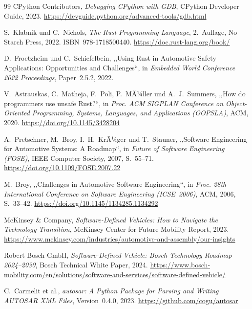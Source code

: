 ﻿\documentclass[12pt,a4paper,twoside]{article}
\newcommand{\doi}[1]{\url{https://doi.org/#1}}
\begin{document}
\begin{thebibliography}{99}
  {CPython Contributors},
  \textit{Debugging CPython with GDB},
  CPython Developer Guide, 2023.
  \url{https://devguide.python.org/advanced-tools/gdb.html}


  S.~Klabnik und C.~Nichols,
  \textit{The Rust Programming Language},
  2.~Auflage, No Starch Press, 2022.
  ISBN~978-1718500440.
  \url{https://doc.rust-lang.org/book/}

  D.~Froetzheim und C.~Schiefelbein,
  ,,Using Rust in Automotive Safety Applications: Opportunities and Challenges``,
  in \textit{Embedded World Conference 2022 Proceedings}, Paper~2.5.2, 2022.

  V.~Astrauskas, C.~Matheja, F.~Poli, P.~MÃ¼ller und A.~J.~Summers,
  ,,How do programmers use unsafe Rust?``,
  in \textit{Proc. ACM SIGPLAN Conference on Object-Oriented Programming,
  Systems, Languages, and Applications (OOPSLA)}, ACM, 2020.
  \doi{10.1145/3428204}


  A.~Pretschner, M.~Broy, I.~H.~KrÃ¼ger und T.~Stauner,
  ,,Software Engineering for Automotive Systems: A Roadmap``,
  in \textit{Future of Software Engineering (FOSE)},
  IEEE Computer Society, 2007, S.~55--71.
  \doi{10.1109/FOSE.2007.22}

  M.~Broy,
  ,,Challenges in Automotive Software Engineering``,
  in \textit{Proc. 28th International Conference on Software Engineering
  (ICSE~2006)}, ACM, 2006, S.~33--42.
  \doi{10.1145/1134285.1134292}

  {McKinsey \& Company},
  \textit{Software-Defined Vehicles: How to Navigate the Technology Transition},
  McKinsey Center for Future Mobility Report, 2023.
  \url{https://www.mckinsey.com/industries/automotive-and-assembly/our-insights}

  {Robert Bosch GmbH},
  \textit{Software-Defined Vehicle: Bosch Technology Roadmap 2024--2030},
  Bosch Technical White Paper, 2024.
  \url{https://www.bosch-mobility.com/en/solutions/software-and-services/software-defined-vehicle/}


  C.~Carmelit et al.,
  \textit{autosar: A Python Package for Parsing and Writing AUTOSAR XML Files},
  Version~0.4.0, 2023.
  \url{https://github.com/cogu/autosar}


\end{thebibliography}
\end{document}
